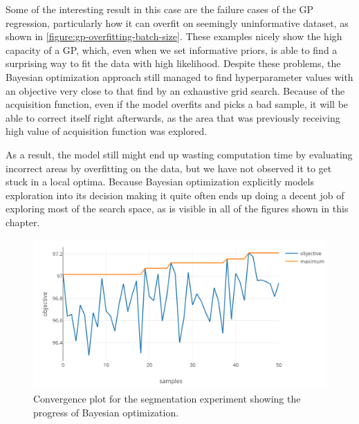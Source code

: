 Some of the interesting result in this case are the failure cases of the GP regression, particularly how it can overfit on seemingly uninformative dataset, as shown in \autoref{figure:gp-overfitting-batch-size}. These examples nicely show the high capacity of a GP, which, even when we set informative priors, is able to find a surprising way to fit the data with high likelihood. Despite these problems, the Bayesian optimization approach still managed to find hyperparameter values with an objective very close to that find by an exhaustive grid search. Because of the acquisition function, even if the model overfits and picks a bad sample, it will be able to correct itself right afterwards, as the area that was previously receiving high value of acquisition function was explored.

As a result, the model still might end up wasting computation time by evaluating incorrect areas by overfitting on the data, but we have not observed it to get stuck in a local optima. Because Bayesian optimization explicitly models exploration into its decision making it quite often ends up doing a decent job of exploring most of the search space, as is visible in all of the figures shown in this chapter.

\begin{figure}
	\begin{center}
		\includegraphics[width=1.0\textwidth]{images/tokenizer-convergence.png}
		\caption{Convergence plot for the segmentation experiment showing the progress of Bayesian optimization.}
		\label{figure:tokenizer-convergence}
	\end{center}
\end{figure}

